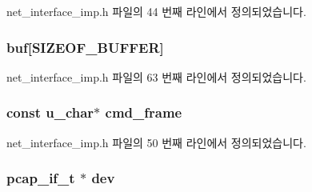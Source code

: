 net\+\_\+interface\+\_\+imp.\+h 파일의 44 번째 라인에서 정의되었습니다.

\subsubsection[{\texorpdfstring{buf}{buf}}]{ buf\mbox{[}{\bf S\+I\+Z\+E\+O\+F\+\_\+\+B\+U\+F\+F\+ER}\mbox{]}\hspace{0.3cm}{\ttfamily [private]}}\hypertarget{classavdecc__lib_1_1net__interface__imp_a2fcf0f59a3bdd4bb28efcf457030232d}{}\label{classavdecc__lib_1_1net__interface__imp_a2fcf0f59a3bdd4bb28efcf457030232d}


net\+\_\+interface\+\_\+imp.\+h 파일의 63 번째 라인에서 정의되었습니다.

\subsubsection[{\texorpdfstring{cmd\+\_\+frame}{cmd_frame}}]{\setlength{\rightskip}{0pt plus 5cm}const u\+\_\+char$\ast$ cmd\+\_\+frame\hspace{0.3cm}{\ttfamily [private]}}\hypertarget{classavdecc__lib_1_1net__interface__imp_aaaccbf362f7c8788f3dcb4d576e4d38d}{}\label{classavdecc__lib_1_1net__interface__imp_aaaccbf362f7c8788f3dcb4d576e4d38d}


net\+\_\+interface\+\_\+imp.\+h 파일의 50 번째 라인에서 정의되었습니다.

\subsubsection[{\texorpdfstring{dev}{dev}}]{\setlength{\rightskip}{0pt plus 5cm}pcap\+\_\+if\+\_\+t $\ast$ dev\hspace{0.3cm}{\ttfamily [private]}}\hypertarget{classavdecc__lib_1_1net__interface__imp_a9d50f4041da5aab1803bd7ba0890271b}{}\label{classavdecc__lib_1_1net__interface__imp_a9d50f4041da5aab1803bd7ba0890271b}


